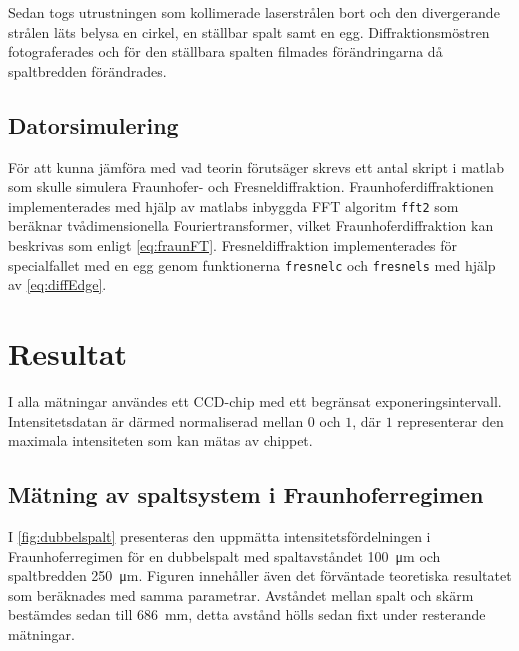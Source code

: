 \documentclass[a4paper]{article}
\begin{document}
  Sedan togs utrustningen som kollimerade laserstrålen bort och den divergerande strålen läts belysa en cirkel, en ställbar spalt samt en egg. Diffraktionsmöstren fotograferades och för den ställbara spalten filmades förändringarna då spaltbredden förändrades.
  
  \subsection{Datorsimulering}
  
  För att kunna jämföra med vad teorin förutsäger skrevs ett antal skript i matlab som skulle simulera Fraunhofer- och Fresneldiffraktion. Fraunhoferdiffraktionen implementerades med hjälp av matlabs inbyggda FFT algoritm \lstinline{fft2} som beräknar tvådimensionella Fouriertransformer, vilket Fraunhoferdiffraktion kan beskrivas som enligt \eqref{eq:fraunFT}. Fresneldiffraktion implementerades för specialfallet med en egg genom funktionerna  \lstinline{fresnelc} och \lstinline{fresnels} med hjälp av \eqref{eq:diffEdge}.

\section{Resultat}

I alla mätningar användes ett CCD-chip med ett begränsat exponeringsintervall. Intensitetsdatan är därmed normaliserad mellan $0$ och $1$, där $1$ representerar den maximala intensiteten som kan mätas av chippet.

\subsection{Mätning av spaltsystem i Fraunhoferregimen}

I \autoref{fig:dubbelspalt} presenteras den uppmätta intensitetsfördelningen i Fraunhoferregimen för en dubbelspalt med spaltavståndet \SI{100}{\micro\m} och spaltbredden \SI{250}{\micro\m}. Figuren innehåller även det förväntade teoretiska resultatet som beräknades med samma parametrar. Avståndet mellan spalt och skärm bestämdes sedan till \SI{686}{\milli\m},  detta avstånd hölls sedan fixt under resterande mätningar.

\FloatBarrier
\end{document}
